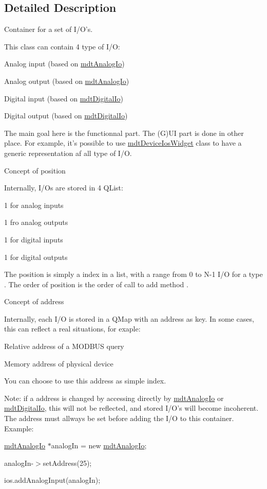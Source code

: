 \subsection{Detailed Description}
Container for a set of I/\-O's. 

This class can contain 4 type of I/\-O\-:
\begin{DoxyItemize}
\item Analog input (based on \hyperlink{classmdt_analog_io}{mdt\-Analog\-Io})
\item Analog output (based on \hyperlink{classmdt_analog_io}{mdt\-Analog\-Io})
\item Digital input (based on \hyperlink{classmdt_digital_io}{mdt\-Digital\-Io})
\item Digital output (based on \hyperlink{classmdt_digital_io}{mdt\-Digital\-Io})
\end{DoxyItemize}

The main goal here is the functionnal part. The (G)U\-I part is done in other place. For example, it's possible to use \hyperlink{classmdt_device_ios_widget}{mdt\-Device\-Ios\-Widget} class to have a generic representation af all type of I/\-O.

Concept of position

Internally, I/\-Os are stored in 4 Q\-List\-:
\begin{DoxyItemize}
\item 1 for analog inputs
\item 1 fro analog outputs
\item 1 for digital inputs
\item 1 for digital outputs
\end{DoxyItemize}

The position is simply a index in a list, with a range from 0 to N-\/1 I/\-O for a type . The order of position is the order of call to add method .

Concept of address

Internally, each I/\-O is stored in a Q\-Map with an address as key. In some cases, this can reflect a real situations, for exaple\-:
\begin{DoxyItemize}
\item Relative address of a M\-O\-D\-B\-U\-S query
\item Memory address of physical device
\end{DoxyItemize}

You can choose to use this address as simple index.

Note\-: if a address is changed by accessing directly by \hyperlink{classmdt_analog_io}{mdt\-Analog\-Io} or \hyperlink{classmdt_digital_io}{mdt\-Digital\-Io}, this will not be reflected, and stored I/\-O's will become incoherent. The address must allways be set before adding the I/\-O to this container. Example\-:
\begin{DoxyItemize}
\item \hyperlink{classmdt_analog_io}{mdt\-Analog\-Io} $\ast$analog\-In = new \hyperlink{classmdt_analog_io}{mdt\-Analog\-Io};
\item analog\-In-\/$>$set\-Address(25);
\item ios.\-add\-Analog\-Input(analog\-In);
\end{DoxyItemize}

